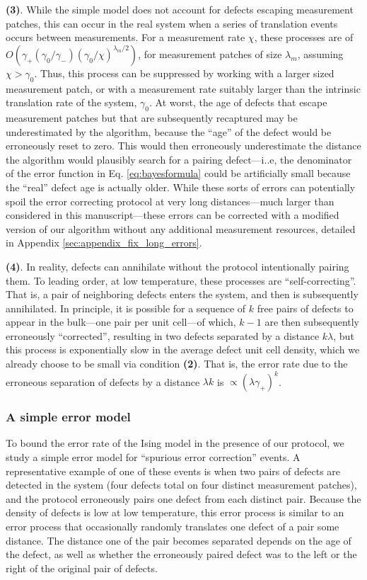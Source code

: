 \documentclass[twocolumn,superscriptaddress,aps,prb,floatfix]{revtex4-1}
\begin{document}
 \textbf{(3)}. While the simple model does not account for defects escaping measurement patches, this can occur in the real system when a series of translation events occurs between measurements.  For a measurement rate $\chi$, these processes are of $O(\gamma_+ (\gamma_0/\gamma_-) (\gamma_0/\chi)^{\lambda_m/2})$, for measurement patches of size $\lambda_m$, assuming $\chi > \gamma_0$.  Thus, this process can be suppressed by working with a larger sized measurement patch, or with a measurement rate suitably larger than the intrinsic translation rate of the system, $\gamma_0$.  At worst, the age of defects that escape measurement patches but that are subsequently recaptured may be underestimated by the algorithm, because the ``age'' of the defect would be erroneously reset to zero.  This would then erroneously underestimate the distance the algorithm would plausibly search for a pairing defect---i..e, the denominator of the error function in Eq. \ref{eq:bayesformula} could be artificially small because the ``real'' defect age is actually older.  While these sorts of errors can potentially spoil the error correcting protocol at very long distances---much larger than considered in this manuscript---these errors can be corrected with a modified version of our algorithm without any additional measurement resources, detailed in Appendix \ref{sec:appendix_fix_long_errors}.

 \textbf{(4)}. In reality, defects can annihilate without the protocol intentionally pairing them.  To leading order, at low temperature, these processes are ``self-correcting''.  That is, a pair of neighboring defects enters the system, and then is subsequently annihilated.  In principle, it is possible for a sequence of $k$ free pairs of defects to appear in the bulk---one pair per unit cell---of which, $k-1$ are then subsequently erroneously ``corrected'', resulting in two defects separated by a distance $k \lambda$, but this process is exponentially slow in the average defect unit cell density, which we already choose to be small via condition \textbf{(2)}.  That is, the error rate due to the erroneous  separation of defects by a distance $\lambda k$ is $\propto(\lambda \gamma_+)^k$.
 

 
 
 \subsubsection{A simple error model}
 \label{sec:threshold}
 
 To bound the error rate of the Ising model in the presence of our protocol, we study a simple error model for ``spurious error correction'' events.  A representative example of one of these events is when two pairs of defects are detected in the system (four defects total on four distinct measurement patches), and the protocol erroneously pairs one defect from each distinct pair.  Because the density of defects is low at low temperature, this error process is similar to an error process that occasionally randomly translates one defect of a pair some distance.  The distance one of the pair becomes separated depends on the age of the defect, as well as whether the erroneously paired defect was to the left or the right of the original pair of defects.
 
\end{document}
